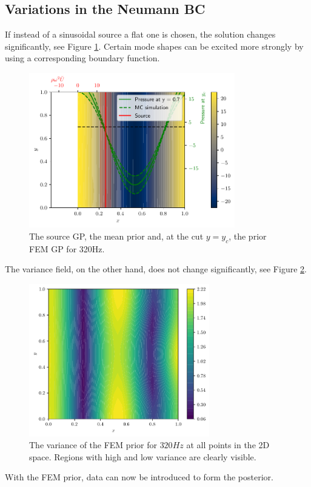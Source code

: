 \documentclass[%
  a4paper,oneside,%
  11pt,%
  smallchapters,
  style=printdev,
  extramargin,
  green,%
  rgb, <cmyk>
  ]{tubsbook}
\begin{document}
\subsection{Variations in the Neumann BC}
If instead of a sinusoidal source a flat one is chosen, the solution changes significantly, see Figure \ref{fig:FEMGPFlat320}. Certain mode shapes can be excited more strongly by using a corresponding boundary function.
\begin{figure}[!ht]
\includegraphics[width=0.8\textwidth]{../../Python/SolutionCustomFlatSource320.pdf}
\centering
\caption{The source GP, the mean prior and, at the cut $y=y_c$, the prior FEM GP for 320Hz.}
\label{fig:FEMGPFlat320}
\end{figure}
%
The variance field, on the other hand, does not change significantly, see Figure \ref{fig:varFieldPriorFlat320}.
\begin{figure}[!ht]
\includegraphics[width=0.7\textwidth]{../../Python/VarFieldFlatSource320.pdf}
\centering
\caption{The variance of the FEM prior for $320Hz$ at all points in the 2D space. Regions with high and low variance are clearly visible.}
\label{fig:varFieldPriorFlat320}
\end{figure}
With the FEM prior, data can now be introduced to form the posterior.
\end{document}
